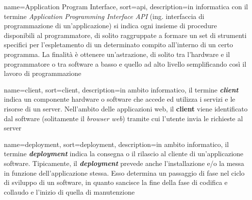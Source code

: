 
\renewcommand{\acronymname}{Acronimi e abbreviazioni}


\renewcommand{\glossaryname}{Glossario}

{
    name=Application Program Interface,
    sort=api,
    description={in informatica con il termine \emph{Application Programming Interface API} (ing. interfaccia di programmazione di un'applicazione) si indica ogni insieme di procedure disponibili al programmatore, di solito raggruppate a formare un set di strumenti specifici per l'espletamento di un determinato compito all'interno di un certo programma. La finalità è ottenere un'astrazione, di solito tra l'hardware e il programmatore o tra software a basso e quello ad alto livello semplificando così il lavoro di programmazione}
}

{
    name=client,
    sort=client,
    description={in ambito informatico, il termine \textit{\textbf{client}} indica un componente hardware o software che accede ed utilizza i servizi e le risorse di un server. Nell’ambito delle applicazioni web, il \textbf{\textbf{client}} viene identificato dal software (solitamente il \textit{browser web}) tramite cui l’utente invia le richieste al server}
}

{
    name=deployment,
    sort=deployment,
    description={in ambito informatico, il termine \textbf{\textit{deployment}} indica la consegna o il rilascio al cliente di un’applicazione software. Tipicamente, il \textit{\textbf{deployment}} prevede anche l’installazione e/o la messa in funzione dell’applicazione stessa. Esso determina un passaggio di fase nel ciclo di sviluppo di un software, in quanto sancisce la fine della fase di codifica e collaudo e l’inizio di quella di manutenzione}
}

